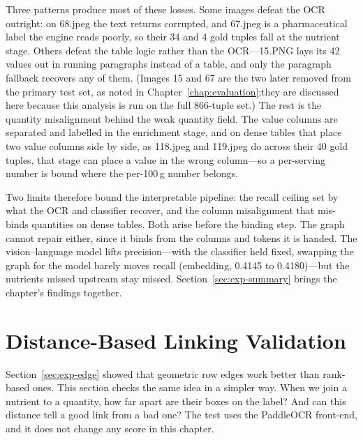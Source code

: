 Three patterns produce most of these losses. Some images defeat the OCR
outright: on 68.jpeg the text returns corrupted, and 67.jpeg is a
pharmaceutical label the engine reads poorly, so their 34 and 4 gold tuples
fall at the nutrient stage. Others defeat the table logic rather than the
OCR---15.PNG lays its 42 values out in running paragraphs instead of a
table, and only the paragraph fallback recovers any of them.
(Images 15 and
67 are the two later removed from the primary test set, as noted in
Chapter~\ref{chap:evaluation};they are discussed here because this analysis
is run on the full 866-tuple set.) The rest is the
quantity misalignment behind the weak quantity field. The value columns are
separated and labelled in the enrichment stage, and on dense tables that
place two value columns side by side, as 118.jpeg and 119.jpeg do across
their 40 gold tuples, that stage can place a value in the wrong column---so
a per-serving number is bound where the per-100\,g number belongs.

Two limits therefore bound the interpretable pipeline: the recall ceiling
set by what the OCR and classifier recover, and the column misalignment that
mis-binds quantities on dense tables. Both arise before the binding step.
The graph cannot repair either, since it binds from the columns and tokens
it is handed. The vision--language model lifts precision---with the
classifier held fixed, swapping the graph for the model barely moves recall
(embedding, 0.4145 to 0.4180)---but the nutrients missed upstream stay
missed. Section~\ref{sec:exp-summary} brings the chapter's findings
together.


\section{Distance-Based Linking Validation}\label{sec:exp-distance}

Section~\ref{sec:exp-edge} showed that geometric row edges work better than
rank-based ones. This section checks the same idea in a simpler way. When we
join a nutrient to a quantity, how far apart are their boxes on the label?
And can this distance tell a good link from a bad one? The test uses the
PaddleOCR front-end, and it does not change any score in this chapter.

